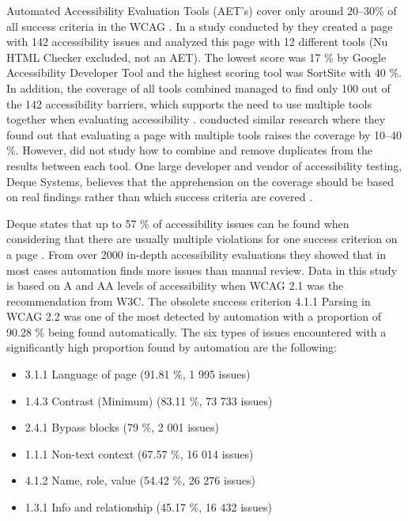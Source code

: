Automated Accessibility Evaluation Tools (AET's) cover only around 20--30\% of all success criteria in the WCAG \citep{govukaccessibilityresults, dequecoverage, webaimmillions}. In a study conducted by \textcite{govukaccessibilityresults} they created a page with 142 accessibility issues and analyzed this page with 12 different tools (Nu HTML Checker excluded, not an AET). The lowest score was 17 \% by Google Accessibility Developer Tool and the highest scoring tool was SortSite with 40 \%. In addition, the coverage of all tools combined managed to find only 100 out of the 142 accessibility barriers, which supports the need to use multiple tools together when evaluating accessibility \citep{govukaccessibilityresults_blog}. \textcite{comparison_10.1145/3371300.3383346} conducted similar research where they found out that evaluating a page with multiple tools raises the coverage by 10--40 \%. However, \textcite{comparison_10.1145/3371300.3383346} did not study how to combine and remove duplicates from the results between each tool. One large developer and vendor of accessibility testing, Deque Systems, believes that the apprehension on the coverage should be based on real findings rather than which success criteria are covered \citep{dequecoverage}. 

Deque states that up to 57 \% of accessibility issues can be found when considering that there are usually multiple violations for one success criterion on a page \citep{dequecoverage}. From over 2000 in-depth accessibility evaluations they showed that in most cases automation finds more issues than manual review. Data in this study is based on A and AA levels of accessibility when WCAG 2.1 was the recommendation from W3C. The obsolete success criterion 4.1.1 Parsing in WCAG 2.2 was one of the most detected by automation with a proportion of 90.28 \% being found automatically. The six types of issues encountered with a significantly high proportion found by automation are the following: 

\begin{itemize}
  \item 3.1.1 Language of page (91.81 \%, 1 995 issues)
  \item 1.4.3 Contrast (Minimum) (83.11 \%, 73 733 issues)
  \item 2.4.1 Bypass blocks (79 \%, 2 001 issues)
  \item 1.1.1 Non-text context (67.57 \%, 16 014 issues)
  \item 4.1.2 Name, role, value (54.42 \%, 26 276 issues)
  \item 1.3.1 Info and relationship (45.17 \%, 16 432 issues)
\end{itemize}

